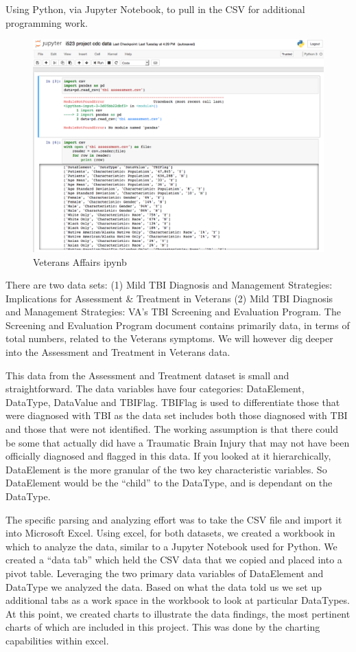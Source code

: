\documentclass[sigconf]{acmart}
\begin{document}
Using Python, via Jupyter Notebook, to pull in the CSV for additional programming work.


\begin{figure}[h]
\includegraphics[width=\columnwidth]{images/graph4.png}
\caption{Veterans Affairs ipynb}\label{f:Veterans Affairs ipynb}
\end{figure}

There are two data sets: (1) Mild TBI Diagnosis and Management Strategies: Implications for Assessment \& Treatment in Veterans (2) Mild TBI Diagnosis and Management Strategies: VA's TBI Screening and Evaluation Program. The Screening and Evaluation Program document contains primarily data, in terms of total numbers, related to the Veterans symptoms.  We will however dig deeper into the Assessment and Treatment in Veterans data.

This data from the Assessment and Treatment dataset is small and straightforward.  The data variables have four categories: DataElement, DataType, DataValue and TBIFlag.  TBIFlag is used to differentiate those that were diagnosed with TBI as the data set includes both those diagnosed with TBI and those that were not identified.  The working assumption is that there could be some that actually did have a Traumatic Brain Injury that may not have been officially diagnosed and flagged in this data. If you looked at it hierarchically, DataElement is the more granular of the two key characteristic variables.  So DataElement would be the ``child'' to the DataType, and is dependant on the DataType. 

The specific parsing and analyzing effort was to take the CSV file and import it into Microsoft Excel.  Using excel, for both datasets, we created a workbook in which to analyze the data, similar to a Jupyter Notebook used for Python.  We created a ``data tab'' which held the CSV data that we copied and placed into a pivot table.  Leveraging the two primary data variables of DataElement and DataType we analyzed the data.  Based on what the data told us we set up additional tabs as a work space in the workbook to look at particular DataTypes.  At this point, we created charts to illustrate the data findings, the most pertinent charts of which are included in this project.  This was done by the charting capabilities within excel.
\end{document}
